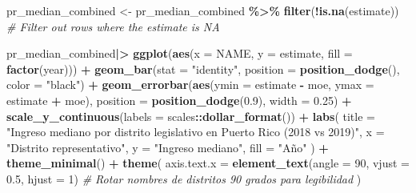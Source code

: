 \documentclass[
]{article}
\newenvironment{Shaded}{\begin{snugshade}}{\end{snugshade}}
\newcommand{\AttributeTok}[1]{\textcolor[rgb]{0.13,0.29,0.53}{#1}}
\newcommand{\CommentTok}[1]{\textcolor[rgb]{0.56,0.35,0.01}{\textit{#1}}}
\newcommand{\DecValTok}[1]{\textcolor[rgb]{0.00,0.00,0.81}{#1}}
\newcommand{\FloatTok}[1]{\textcolor[rgb]{0.00,0.00,0.81}{#1}}
\newcommand{\FunctionTok}[1]{\textcolor[rgb]{0.13,0.29,0.53}{\textbf{#1}}}
\newcommand{\NormalTok}[1]{#1}
\newcommand{\OtherTok}[1]{\textcolor[rgb]{0.56,0.35,0.01}{#1}}
\newcommand{\SpecialCharTok}[1]{\textcolor[rgb]{0.81,0.36,0.00}{\textbf{#1}}}
\newcommand{\StringTok}[1]{\textcolor[rgb]{0.31,0.60,0.02}{#1}}
\begin{document}
\begin{Shaded}
\begin{Highlighting}[]
\NormalTok{pr\_median\_combined }\OtherTok{\textless{}{-}}\NormalTok{ pr\_median\_combined }\SpecialCharTok{\%\textgreater{}\%}
  \FunctionTok{filter}\NormalTok{(}\SpecialCharTok{!}\FunctionTok{is.na}\NormalTok{(estimate))  }\CommentTok{\# Filter out rows where the estimate is NA}

\NormalTok{pr\_median\_combined}\SpecialCharTok{|\textgreater{}}
  \FunctionTok{ggplot}\NormalTok{(}\FunctionTok{aes}\NormalTok{(}\AttributeTok{x =}\NormalTok{ NAME, }\AttributeTok{y =}\NormalTok{ estimate, }\AttributeTok{fill =} \FunctionTok{factor}\NormalTok{(year))) }\SpecialCharTok{+}
  \FunctionTok{geom\_bar}\NormalTok{(}\AttributeTok{stat =} \StringTok{"identity"}\NormalTok{, }\AttributeTok{position =} \FunctionTok{position\_dodge}\NormalTok{(), }\AttributeTok{color =} \StringTok{"black"}\NormalTok{) }\SpecialCharTok{+}
  \FunctionTok{geom\_errorbar}\NormalTok{(}\FunctionTok{aes}\NormalTok{(}\AttributeTok{ymin =}\NormalTok{ estimate }\SpecialCharTok{{-}}\NormalTok{ moe, }\AttributeTok{ymax =}\NormalTok{ estimate }\SpecialCharTok{+}\NormalTok{ moe), }
                \AttributeTok{position =} \FunctionTok{position\_dodge}\NormalTok{(}\FloatTok{0.9}\NormalTok{), }\AttributeTok{width =} \FloatTok{0.25}\NormalTok{) }\SpecialCharTok{+}
  \FunctionTok{scale\_y\_continuous}\NormalTok{(}\AttributeTok{labels =}\NormalTok{ scales}\SpecialCharTok{::}\FunctionTok{dollar\_format}\NormalTok{()) }\SpecialCharTok{+}
  \FunctionTok{labs}\NormalTok{(}
    \AttributeTok{title =} \StringTok{"Ingreso mediano por distrito legislativo en Puerto Rico (2018 vs 2019)"}\NormalTok{,}
    \AttributeTok{x =} \StringTok{"Distrito representativo"}\NormalTok{,}
    \AttributeTok{y =} \StringTok{"Ingreso mediano"}\NormalTok{,}
    \AttributeTok{fill =} \StringTok{"Año"}
\NormalTok{  ) }\SpecialCharTok{+}
  \FunctionTok{theme\_minimal}\NormalTok{() }\SpecialCharTok{+}
  \FunctionTok{theme}\NormalTok{(}
    \AttributeTok{axis.text.x =} \FunctionTok{element\_text}\NormalTok{(}\AttributeTok{angle =} \DecValTok{90}\NormalTok{, }\AttributeTok{vjust =} \FloatTok{0.5}\NormalTok{, }\AttributeTok{hjust =} \DecValTok{1}\NormalTok{)  }\CommentTok{\# Rotar nombres de distritos 90 grados para legibilidad}
\NormalTok{  )}
\end{Highlighting}
\end{Shaded}
\end{document}
